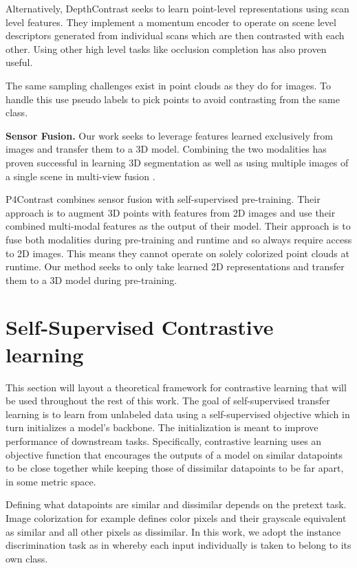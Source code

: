 \documentclass[10pt,twocolumn,letterpaper]{article}
\begin{document}
Alternatively, DepthContrast \cite{zhang2021Self} seeks to learn point-level representations using scan level features. They implement a momentum encoder \cite{he_momentum_2020} to operate on scene level descriptors generated from individual scans which are then contrasted with each other. Using other high level tasks like occlusion completion \cite{wang_unsupervised_nodate} has also proven useful.

The same sampling challenges exist in point clouds as they do for images. To handle this \cite{jiang2021Guided} use pseudo labels to pick points to avoid contrasting from the same class.

\textbf{Sensor Fusion.} Our work seeks to leverage features learned exclusively from images and transfer them to a 3D model. Combining the two modalities has proven successful in learning 3D segmentation \cite{hou20193d, genova2021learning, frey_continual_2021, angela2018joint} as well as using multiple images of a single scene in multi-view fusion \cite{kundu2020virtual}.

P4Contrast \cite{yunze2020p4contrast} combines sensor fusion with self-supervised pre-training. Their approach is to augment 3D points with features from 2D images and use their combined multi-modal features as the output of their model. Their approach is to fuse both modalities during pre-training and runtime and so always require access to 2D images. This means they cannot operate on solely colorized point clouds at runtime. Our method seeks to only take learned 2D representations and transfer them to a 3D model during pre-training.

\section{Self-Supervised Contrastive learning}
\label{sec:contrastiveLearning}

This section will layout a theoretical framework for contrastive learning that will be used throughout the rest of this work.
The goal of self-supervised transfer learning is to learn from unlabeled data using a self-supervised objective which in turn initializes a model's backbone. The initialization is meant to improve performance of downstream tasks. Specifically, contrastive learning uses an objective function that encourages the outputs of a model on similar datapoints to be close together while keeping those of dissimilar datapoints to be far apart, in some metric space.

Defining what datapoints are similar and dissimilar depends on the pretext task. Image colorization for example defines color pixels and their grayscale equivalent as similar and all other pixels as dissimilar. In this work, we adopt the instance discrimination task as in \cite{} whereby each input individually is taken to belong to its own class.
\end{document}
